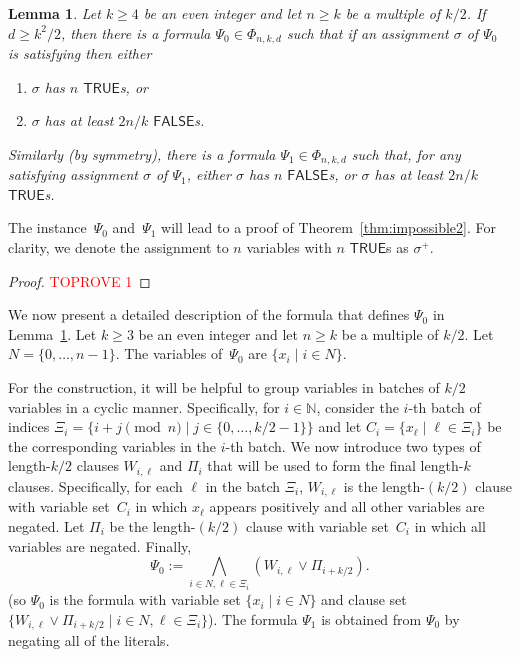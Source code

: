 \documentclass[11pt]{article}
\newtheorem{lemma}[theorem]{Lemma}
\theoremstyle{definition}
\theoremstyle{remark}
\def\TRUE{\mathsf{TRUE}}
\def\FALSE{\mathsf{FALSE}}
\begin{document}
\begin{lemma}\label{lem: gadget}
Let $k\ge 4$ be an even integer and let $n\geq k$ be a multiple of $k/2$. If $d\ge k^2/2$, then there is a formula $\Psi_0\in\Phi_{n,k,d}$  such that if an assignment $\sigma$ of $\Psi_0$   is satisfying then either 
    \begin{enumerate}
        \item $\sigma$ has $n$ $\TRUE$s, or
        \item $\sigma$ has at least $2n/k$ $\FALSE$s.  
    \end{enumerate}
Similarly (by symmetry), there is a formula $\Psi_1 \in \Phi_{n,k,d}$ such that, for any satisfying assignment $\sigma$ of $\Psi_1$, either   $\sigma$ has $n$  $\FALSE$s, or $\sigma$ has at least $2n/k$  $\TRUE$s.   
\end{lemma}
The instance~$\Psi_0$ and~$\Psi_1$ will lead to a proof of Theorem~\ref{thm:impossible2}.
For clarity, we denote the assignment to $n$ variables with 
$n$ $\TRUE$s as $\sigma^+$.
\begin{proof}\textcolor{red}{TOPROVE 1}\end{proof}



  
 
 

We now present a detailed description of the formula that defines $\Psi_0$ in Lemma~\ref{lem: gadget}. 
Let $k\geq 3$ be an even integer and let $n\geq k$ be a multiple of $k/2$.  
Let $N = \{0,\ldots,n-1\}$.
The variables of~$\Psi_0$ are $\{ x_i \mid i\in N\}$. 
 

For the construction, it will be helpful to group variables in batches of $k/2$ variables in a cyclic manner. Specifically, for $i\in  \mathbb{N}$, consider the $i$-th batch of indices
$\Xi_i = \{ i+j \pmod n \mid j \in \{0,\ldots, k/2-1\} \}$ 
and let $C_i = \{x_\ell \mid \ell \in \Xi_i\}$ be the corresponding variables in the $i$-th batch. We now introduce two types of length-$k/2$ clauses $W_{i,\ell}$ and $\Pi_i$ that will be used to form the final length-$k$ clauses. 
Specifically, for each $\ell$ in the batch $\Xi_i$, $W_{i,\ell}$ is the length-$(k/2)$ clause with variable set~$C_i$ in which $x_\ell$ appears positively and all other variables are negated. 
Let $\Pi_i$ be the length-$(k/2)$ clause with variable set~$C_i$ in which all variables are negated. 
Finally, 
\[\Psi_0 := \bigwedge_{i\in N, \ell \in \Xi_i} (W_{i,\ell} \vee \Pi_{i+k/2}).\]
(so
 $\Psi_0$
is the formula with variable set $  \{ x_i \mid i \in N\}$ 
and clause set 
$  \{ W_{i,\ell} \vee \Pi_{i+k/2} \mid  {i \in  N}, {\ell \in \Xi_{i}}  \}  
 $).
The formula $\Psi_1$ is obtained from $\Psi_0$ by negating all of the literals.
 
\end{document}
